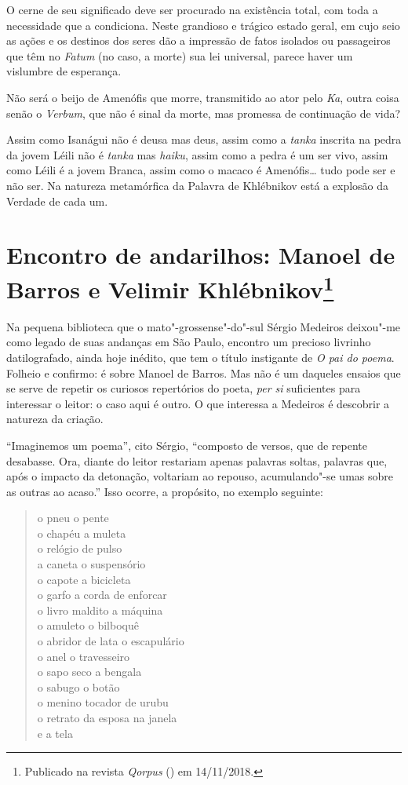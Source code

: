 O cerne de seu significado deve ser procurado na existência total,
com toda a necessidade que a condiciona. Neste grandioso e trágico
estado geral, em cujo seio as ações e os destinos dos seres dão a
impressão de fatos isolados ou passageiros que têm no \emph{Fatum}
(no caso, a morte) sua lei universal, parece haver um vislumbre de
esperança.

Não será o beijo de Amenófis que morre, transmitido ao ator pelo
\emph{Ka}, outra coisa senão o \emph{Verbum}, que não é sinal da morte,
mas promessa de continuação de vida?

Assim como Isanágui não é deusa mas deus, assim como a \emph{tanka}
inscrita na pedra da jovem Léili não é \emph{tanka} mas \emph{haiku},
assim como a pedra é um ser vivo, assim como Léili é a jovem Branca,
assim como o macaco é Amenófis\ldots{} tudo pode ser e não ser. Na natureza
metamórfica da Palavra de Khlébnikov está a explosão da Verdade de cada
um.

\chapter{Encontro de andarilhos: Manoel de Barros e Velimir Khlébnikov\footnote{Publicado na revista
  \emph{Qorpus} (\protect{}) em 14/11/2018.}}
\label{andarilhos}

Na pequena biblioteca que o mato"-grossense"-do"-sul Sérgio Medeiros
deixou"-me como legado de suas andanças em São Paulo, encontro um
precioso livrinho datilografado, ainda hoje inédito, que tem o título
instigante de \emph{O pai do poema}. Folheio e confirmo: é sobre Manoel
de Barros. Mas não é um daqueles ensaios que se serve de repetir os
curiosos repertórios do poeta, \emph{per si} suficientes para interessar
o leitor: o caso aqui é outro. O que interessa a Medeiros é descobrir a
natureza da criação.

``Imaginemos um poema'', cito Sérgio, ``composto de versos, que de
repente desabasse. Ora, diante do leitor restariam apenas palavras
soltas, palavras que, após o impacto da detonação, voltariam ao repouso,
acumulando"-se umas sobre as outras ao acaso.'' Isso ocorre, a propósito,
no exemplo seguinte:

\begin{verse}
o pneu o pente \\
o chapéu a muleta \\
o relógio de pulso \\
a caneta o suspensório \\
o capote a bicicleta \\
o garfo a corda de enforcar \\
o livro maldito a máquina \\
o amuleto o bilboquê \\
o abridor de lata o escapulário \\
o anel o travesseiro \\
o sapo seco a bengala \\
o sabugo o botão \\
o menino tocador de urubu \\
o retrato da esposa na janela \\
e a tela
\end{verse}

